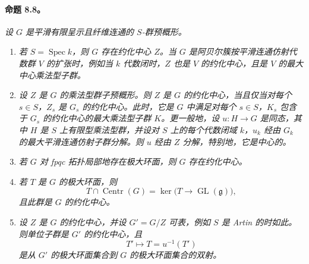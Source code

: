 \paragraph{\textbf{命题 8.8。}}
\emph{设 \(G\) 是平滑有限呈示且纤维连通的 \(S\)-群预概形。}
\begin{enumerate}
\item[\emph{(a)}] \emph{若 \(S=\operatorname{Spec}k\)，则 \(G\) 存在约化中心 \(Z\)。当 \(G\) 是阿贝尔簇按平滑连通仿射代数群 \(V\) 的扩张时，例如当 \(k\) 代数闭时，\(Z\) 也是 \(V\) 的约化中心，且是 \(V\) 的最大中心乘法型子群。}
\item[\emph{(b)}] \emph{设 \(Z\) 是 \(G\) 的乘法型群子预概形。则 \(Z\) 是 \(G\) 的约化中心，当且仅当对每个 \(s\in S\)，\(Z_s\) 是 \(G_s\) 的约化中心。此时，它是 \(G\) 中满足对每个 \(s\in S\)，\(K_s\) 包含于 \(G_s\) 的约化中心的最大乘法型子群 \(K\)。更一般地，设 \(u:H\to G\) 是同态，其中 \(H\) 是 \(S\) 上有限型乘法型群，并设对 \(S\) 上的每个代数闭域 \(k\)，\(u_k\) 经由 \(G_k\) 的最大平滑连通仿射子群分解。则 \(u\) 经由 \(Z\) 分解，特别地，它是中心的。}
\item[\emph{(c)}] \emph{若 \(G\) 对 fpqc 拓扑局部地存在极大环面，则 \(G\) 存在约化中心。}
\item[\emph{(d)}] \emph{若 \(T\) 是 \(G\) 的极大环面，则}
\[
  T\cap\operatorname{Centr}(G)
  =\ker\bigl(T\longrightarrow\operatorname{GL}(\mathfrak g)\bigr),
\]
\emph{且此群是 \(G\) 的约化中心。}
\item[\emph{(e)}] \emph{设 \(Z\) 是 \(G\) 的约化中心，并设 \(G'=G/Z\) 可表，例如 \(S\) 是 Artin 的时如此。则单位子群是 \(G'\) 的约化中心，且}
\[
  T'\longmapsto T=u^{-1}(T')
\]
\emph{是从 \(G'\) 的极大环面集合到 \(G\) 的极大环面集合的双射。}
\end{enumerate}

